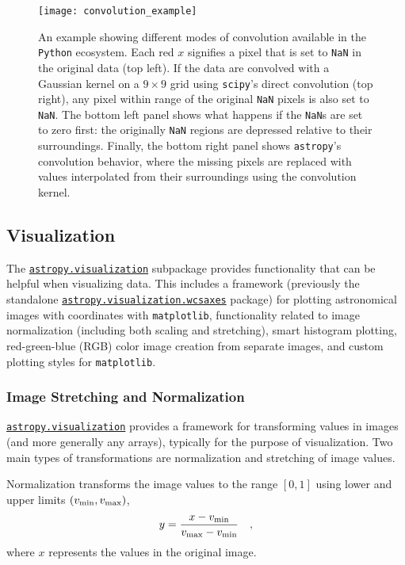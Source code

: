 \documentclass[modern]{aastex62}
\newcommand{\package}[1]{\texttt{#1}\xspace}
\newcommand{\python}{\package{Python}}
\newcommand{\astropypkg}{\package{astropy}}
\newcommand{\astropysubpkg}[1]{\href{http://docs.astropy.org/en/stable/#1/index.html}{\texttt{astropy.#1}}\xspace}
\newcommand{\astropywcsaxes}{\href{http://docs.astropy.org/en/stable/visualization/wcsaxes/index.html}{\texttt{astropy.visualization.wcsaxes}}\xspace}
\begin{document}
\begin{figure}
\texttt{[image: convolution\_example]}
\caption{%
    An example showing different modes of convolution available in the \python
    ecosystem.  Each red $x$ signifies a pixel that is set to \texttt{NaN} in the
    original data (top left).  If the data are convolved with a Gaussian kernel on a
    $9\times 9$ grid using
    \package{scipy}'s direct convolution (top right), any pixel within range of the original \texttt{NaN}
    pixels is also set to \texttt{NaN}.  The bottom left panel shows what happens if the
    \texttt{NaN}s are set to zero first: the originally \texttt{NaN} regions are
    depressed relative to their surroundings.  Finally, the bottom right panel shows
    \astropypkg's convolution behavior, where the missing pixels are replaced
    with values interpolated from their surroundings using the convolution
    kernel.
    \label{fig:convolution-example}
}
\end{figure}


\subsection{Visualization}

The \astropysubpkg{visualization} subpackage provides functionality that can
be helpful when visualizing data. This includes a framework (previously the
standalone \astropywcsaxes package) for plotting
astronomical images with coordinates with \package{matplotlib}, functionality related to image
normalization (including both scaling and stretching), smart histogram
plotting, red-green-blue (RGB) color image creation from separate images,
and custom plotting styles for \package{matplotlib}.

\subsubsection{Image Stretching and Normalization}

\label{sec:stretch}

\astropysubpkg{visualization} provides a framework for transforming values in
images (and more generally any arrays), typically for the purpose of
visualization. Two main types of transformations are normalization and
stretching of image values.

Normalization transforms the image values to the range $[0,1]$ using lower and
upper limits $(v_{\rm min}, v_{\rm max})$,
\begin{equation}
y = \frac{x - v_{\rm min}}{v_{\rm max} - v_{\rm min}} \quad ,
\end{equation}
where $x$ represents the values in the original image.
\end{document}
